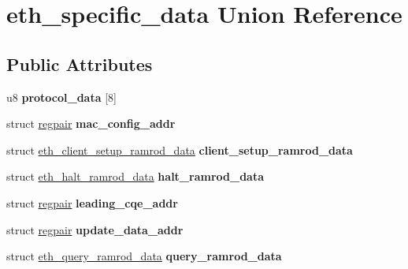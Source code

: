 \hypertarget{unioneth__specific__data}{
\section{eth\_\-specific\_\-data Union Reference}
\label{unioneth__specific__data}
}
\subsection*{Public Attributes}
\begin{DoxyCompactItemize}
\item 
\hypertarget{unioneth__specific__data_a2dbf96f199c162b889ec2e022386c40b}{
u8 {\bfseries protocol\_\-data} \mbox{[}8\mbox{]}}
\label{unioneth__specific__data_a2dbf96f199c162b889ec2e022386c40b}

\item 
\hypertarget{unioneth__specific__data_a89468d0201d58690e383831874b82e59}{
struct \hyperlink{structregpair}{regpair} {\bfseries mac\_\-config\_\-addr}}
\label{unioneth__specific__data_a89468d0201d58690e383831874b82e59}

\item 
\hypertarget{unioneth__specific__data_ac52050b5852e48858c072c0d71bcfeb9}{
struct \hyperlink{structeth__client__setup__ramrod__data}{eth\_\-client\_\-setup\_\-ramrod\_\-data} {\bfseries client\_\-setup\_\-ramrod\_\-data}}
\label{unioneth__specific__data_ac52050b5852e48858c072c0d71bcfeb9}

\item 
\hypertarget{unioneth__specific__data_a2aa8a9fc413e3c92e9121d51a89b87f9}{
struct \hyperlink{structeth__halt__ramrod__data}{eth\_\-halt\_\-ramrod\_\-data} {\bfseries halt\_\-ramrod\_\-data}}
\label{unioneth__specific__data_a2aa8a9fc413e3c92e9121d51a89b87f9}

\item 
\hypertarget{unioneth__specific__data_a29586ae807f7eedb930656a2b46d3977}{
struct \hyperlink{structregpair}{regpair} {\bfseries leading\_\-cqe\_\-addr}}
\label{unioneth__specific__data_a29586ae807f7eedb930656a2b46d3977}

\item 
\hypertarget{unioneth__specific__data_aeddf6617c36b151713c9687fd0eb534e}{
struct \hyperlink{structregpair}{regpair} {\bfseries update\_\-data\_\-addr}}
\label{unioneth__specific__data_aeddf6617c36b151713c9687fd0eb534e}

\item 
\hypertarget{unioneth__specific__data_ac6ffdb9ffbbef3aed4a952e48a098b35}{
struct \hyperlink{structeth__query__ramrod__data}{eth\_\-query\_\-ramrod\_\-data} {\bfseries query\_\-ramrod\_\-data}}
\label{unioneth__specific__data_ac6ffdb9ffbbef3aed4a952e48a098b35}

\end{DoxyCompactItemize}


